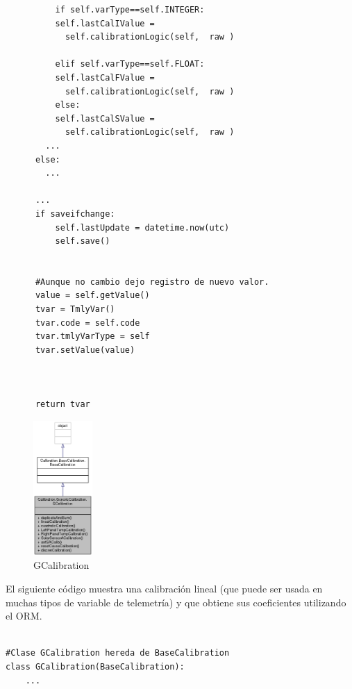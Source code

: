 \documentclass[twoside,twocolumn]{article}
\begin{document}
{{\begin{verbatim}
	      if self.varType==self.INTEGER:
		  self.lastCalIValue = 
		    self.calibrationLogic(self,  raw )
	  
	      elif self.varType==self.FLOAT:
		  self.lastCalFValue = 
		    self.calibrationLogic(self,  raw )
	      else:
		  self.lastCalSValue = 
		    self.calibrationLogic(self,  raw )
		...
	  else:
		...
	
	  ...
	  if saveifchange:
	      self.lastUpdate = datetime.now(utc)
	      self.save()
      
	
      #Aunque no cambio dejo registro de nuevo valor.
      value = self.getValue()
      tvar = TmlyVar()
      tvar.code = self.code
      tvar.tmlyVarType = self
      tvar.setValue(value)
      
      

      return tvar
\end{verbatim}








\begin{figure}[]
  \caption{GCalibration}
  \label{fig:GCalibration}
  \centering
  \includegraphics[width=0.2\textwidth]{Imagenes/GenericCalibration.png}
\end{figure}


El siguiente código muestra una calibración lineal (que puede ser usada en muchas tipos de variable de telemetría) y que obtiene sus coeficientes utilizando el ORM.

\begin{verbatim}

#Clase GCalibration hereda de BaseCalibration
class GCalibration(BaseCalibration):
    ...
  

\end{verbatim}}}
\end{document}
